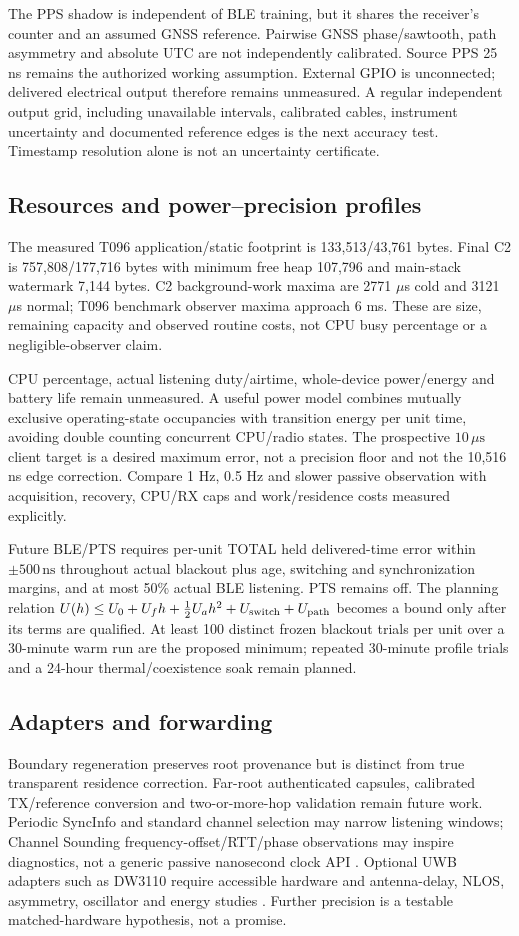 \documentclass[11pt,letterpaper]{article}
\newcommand{\ns}{\,\mathrm{ns}}
\newcommand{\us}{\,\mu\mathrm{s}}
\newcommand{\page}{\clearpage}
\begin{document}
The PPS shadow is independent of BLE training, but it shares the receiver's counter and an assumed GNSS reference. Pairwise GNSS phase/sawtooth, path asymmetry and absolute UTC are not independently calibrated. Source PPS 25 ns remains the authorized working assumption. External GPIO is unconnected; delivered electrical output therefore remains unmeasured. A regular independent output grid, including unavailable intervals, calibrated cables, instrument uncertainty and documented reference edges is the next accuracy test. Timestamp resolution alone is not an uncertainty certificate.

\subsection{Resources and power--precision profiles}
The measured T096 application/static footprint is 133,513/43,761 bytes. Final C2 is 757,808/177,716 bytes with minimum free heap 107,796 and main-stack watermark 7,144 bytes. C2 background-work maxima are 2771 $\mu$s cold and 3121 $\mu$s normal; T096 benchmark observer maxima approach 6 ms. These are size, remaining capacity and observed routine costs, not CPU busy percentage or a negligible-observer claim.

CPU percentage, actual listening duty/airtime, whole-device power/energy and battery life remain unmeasured. A useful power model combines mutually exclusive operating-state occupancies with transition energy per unit time, avoiding double counting concurrent CPU/radio states. The prospective $10\us$ client target is a desired maximum error, not a precision floor and not the 10,516 ns edge correction. Compare 1 Hz, 0.5 Hz and slower passive observation with acquisition, recovery, CPU/RX caps and work/residence costs measured explicitly.

Future BLE/PTS requires per-unit TOTAL held delivered-time error within $\pm500\ns$ throughout actual blackout plus age, switching and synchronization margins, and at most 50\% actual BLE listening. PTS remains off. The planning relation $U(h)\le U_0+U_fh+\tfrac12U_ah^2+U_{\rm switch}+U_{\rm path}$ becomes a bound only after its terms are qualified. At least 100 distinct frozen blackout trials per unit over a 30-minute warm run are the proposed minimum; repeated 30-minute profile trials and a 24-hour thermal/coexistence soak remain planned.

\subsection{Adapters and forwarding}
Boundary regeneration preserves root provenance but is distinct from true transparent residence correction. Far-root authenticated capsules, calibrated TX/reference conversion and two-or-more-hop validation remain future work. Periodic SyncInfo and standard channel selection may narrow listening windows; Channel Sounding frequency-offset/RTT/phase observations may inspire diagnostics, not a generic passive nanosecond clock API \cite{sig,cs}. Optional UWB adapters such as DW3110 require accessible hardware and antenna-delay, NLOS, asymmetry, oscillator and energy studies \cite{uwb}. Further precision is a testable matched-hardware hypothesis, not a promise.
\page
\end{document}
